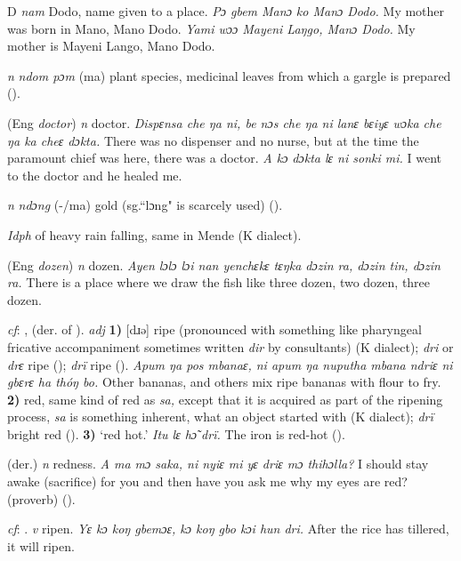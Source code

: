 \begin{letter}{D}
 \textit{nam} Dodo, name given to a place. \textit{Pɔ gbem Manɔ ko Manɔ Dodo.} My mother was born in Mano, Mano Dodo. \textit{Yami wɔɔ Mayeni Laŋgo, Manɔ Dodo.} My mother is Mayeni Lango, Mano Dodo.

 \textit{n} \textit{ndom pɔm} (ma) plant species, medicinal leaves from which a gargle is prepared (\citealt{Pichl1967}). 

 (Eng \textit{doctor}) \textit{n} doctor. \textit{Dispɛnsa che ŋa ni, be nɔs che ŋa ni lanɛ bɛiyɛ wɔka che ŋa ka cheɛ dɔkta.} There was no dispenser and no nurse, but at the time the paramount chief was here, there was a doctor. \textit{A kɔ dɔkta lɛ ni sonki mi.} I went to the doctor and he healed me.

 \textit{n} \textit{ndɔng} (-/ma) gold (sg.“lɔng" is scarcely used) (\citealt{Pichl1967}). 

 \textit{Idph} of heavy rain falling, same in Mende (K dialect). 

 (Eng \textit{dozen}) \textit{n} dozen. \textit{Ayen lɔlɔ lɔi nan yenchɛkɛ tɛŋka dɔzin ra, dɔzin tin, dɔzin ra.} There is a place where we draw the fish like three dozen, two dozen, three dozen.

 \textit{cf}: ,  (der. of ). \textit{adj} \textbf{1)} [dɹə] ripe (pronounced with something like pharyngeal fricative accompaniment sometimes written \textit{dir} by consultants) (K dialect); \textit{dri} or \textit{drɛ} ripe (\citealt{Sumner1921}); \textit{drï} ripe (\citealt{Pichl1967}). \textit{Apum ŋa pos mbanaɛ, ni apum ŋa nuputha mbana ndriɛ ni gbɛrɛ ha thóŋ bo.} Other bananas, and others mix ripe bananas with flour to fry. \textbf{2)} red, same kind of red as \textit{sa,} except that it is acquired as part of the ripening process, \textit{sa} is something inherent, what an object started with (K dialect); \textit{drï} bright red (\citealt{Pichl1967}). \textbf{3)} ‘red hot.' \textit{Itu lɛ hɔ̃ drï.} The iron is red-hot (\citealt{Pichl1967}). 

 (der.) \textit{n} redness. \textit{A ma mɔ saka, ni nyiɛ mi yɛ driɛ mɔ thihɔlla?} I should stay awake (sacrifice) for you and then have you ask me why my eyes are red? (proverb) (\citealt{TISLL1979}). 

 \textit{cf}: . \textit{v} ripen. \textit{Yɛ kɔ koŋ gbemɔɛ, kɔ koŋ gbo kɔi hun dri.} After the rice has tillered, it will ripen.


\end{letter}
